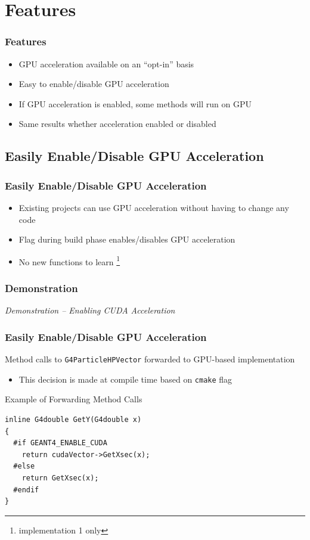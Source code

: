 \documentclass{beamer}
\begin{document}
\section{Features}
\begin{frame}
\frametitle{Features}
\begin{itemize}
\item GPU acceleration available on an ``opt-in'' basis
\item Easy to enable/disable GPU acceleration
\item If GPU acceleration is enabled, some methods will run on GPU
\item Same results whether acceleration enabled or disabled
\end{itemize}
\end{frame}

\subsection{Easily Enable/Disable GPU Acceleration}
\begin{frame}
\frametitle{Easily Enable/Disable GPU Acceleration}
\begin{itemize}
\item Existing projects can use GPU acceleration without having to change any code 
\item Flag during build phase enables/disables GPU acceleration
\item No new functions to learn \footnote{implementation 1 only}
\end{itemize}
\end{frame}

\begin{frame}
\frametitle{Demonstration}
\begin{center}
\emph{Demonstration -- Enabling CUDA Acceleration}
\end{center}
\end{frame}

\begin{frame}[fragile]
\frametitle{Easily Enable/Disable GPU Acceleration}
Method calls to \texttt{G4ParticleHPVector} forwarded to GPU-based implementation
\begin{itemize}
\item This decision is made at compile time based on \texttt{cmake} flag
\end{itemize}

\begin{block}{Example of Forwarding Method Calls}
\begin{lstlisting}
inline G4double GetY(G4double x)
{
  #if GEANT4_ENABLE_CUDA
    return cudaVector->GetXsec(x);
  #else
    return GetXsec(x);
  #endif
}
\end{lstlisting}
\end{block}
\end{frame}
\end{document}
